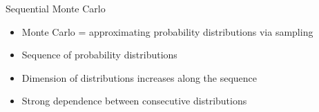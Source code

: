 \documentclass[aspectratio=169]{beamer}
\theoremstyle{definition}
\begin{document}
\begin{frame}{Sequential Monte Carlo}
\begin{itemize}[<+->]
\item Monte Carlo = approximating probability distributions via sampling %
\item Sequence of probability distributions %
\item Dimension of distributions increases along the sequence
\item Strong dependence between consecutive distributions
\end{itemize}


\end{frame}
\end{document}
